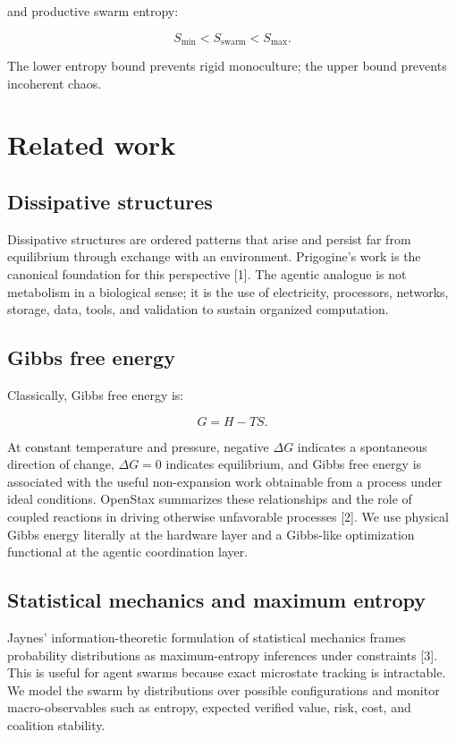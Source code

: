 \documentclass[
  11pt,
]{article}
\begin{document}
and productive swarm entropy:

\[
S_{\min}<S_{\text{swarm}}<S_{\max}.
\]

The lower entropy bound prevents rigid monoculture; the upper bound
prevents incoherent chaos.

\section{Related work}\label{related-work}

\subsection{Dissipative structures}\label{dissipative-structures}

Dissipative structures are ordered patterns that arise and persist far
from equilibrium through exchange with an environment. Prigogine's work
is the canonical foundation for this perspective {[}1{]}. The agentic
analogue is not metabolism in a biological sense; it is the use of
electricity, processors, networks, storage, data, tools, and validation
to sustain organized computation.

\subsection{Gibbs free energy}\label{gibbs-free-energy}

Classically, Gibbs free energy is:

\[
G=H-TS.
\]

At constant temperature and pressure, negative \(\Delta G\) indicates a
spontaneous direction of change, \(\Delta G=0\) indicates equilibrium,
and Gibbs free energy is associated with the useful non-expansion work
obtainable from a process under ideal conditions. OpenStax summarizes
these relationships and the role of coupled reactions in driving
otherwise unfavorable processes {[}2{]}. We use physical Gibbs energy
literally at the hardware layer and a Gibbs-like optimization functional
at the agentic coordination layer.

\subsection{Statistical mechanics and maximum
entropy}\label{statistical-mechanics-and-maximum-entropy}

Jaynes' information-theoretic formulation of statistical mechanics
frames probability distributions as maximum-entropy inferences under
constraints {[}3{]}. This is useful for agent swarms because exact
microstate tracking is intractable. We model the swarm by distributions
over possible configurations and monitor macro-observables such as
entropy, expected verified value, risk, cost, and coalition stability.
\end{document}
